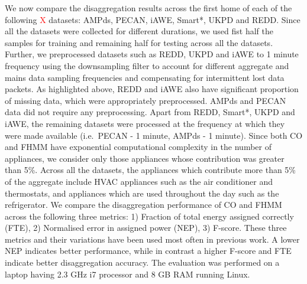 \documentclass{sig-alternate}
\newcommand{\redcolor}[1]{\textcolor{red}{#1}}
\newcommand{\tabref}[1]{Table~\ref{#1}}
\begin{document}
\noindent
We now compare the disaggregation results across the first home of each of the following \redcolor{X} datasets: AMPds, PECAN, iAWE, Smart*, UKPD and REDD. Since all the datasets were collected for different durations, we used fist half the samples for training and remaining half for testing across all the datasets. Further, we preprocessed datasets such as REDD, UKPD and iAWE to 1 minute frequency using the downsampling filter to account for different aggregate and mains data sampling frequencies and compensating for intermittent lost data packets. 
As highlighted above, REDD and iAWE also have significant proportion of missing data, which were appropriately preprocessed. AMPds and PECAN data did not require any preprocessing. Apart from REDD, Smart*, UKPD and iAWE, the remaining datasets were processed at the frequency at which they were made available (i.e.\ PECAN - 1 minute, AMPds - 1 minute). Since both CO and FHMM have exponential computational complexity in the number of appliances, we consider only those appliances whose contribution was greater than 5\%. Across all the datasets, the appliances which contribute more than 5\% of the aggregate include HVAC appliances such as the air conditioner and thermostats, and appliances which are used throughout the day such as the refrigerator. We compare the disaggregation performance of CO and FHMM across the following three metrics: 1) Fraction of total energy assigned correctly (FTE), 2) Normalised error in assigned power (NEP), 3) F-score. These three metrics and their variations have been used most often in previous work. %
A lower NEP indicates better performance, while in contrast a higher F-score and FTE indicate better disaggregation accuracy. The evaluation was performed on a laptop having 2.3 GHz i7 processor and 8 GB RAM running Linux.

\end{document}
